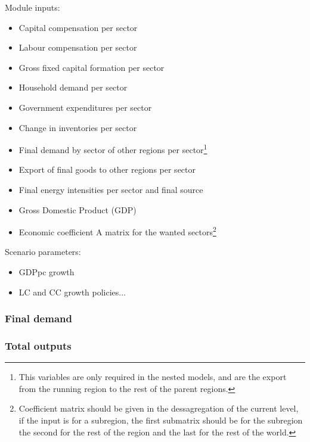 

Module inputs:
\begin{itemize}
    \item Capital compensation per sector
    \item Labour compensation per sector
    \item Gross fixed capital formation per sector
    \item Household demand per sector
    \item Government expenditures per sector
    \item Change in inventories per sector
    \item Final demand by sector of other regions per sector\footnote{\label{fnote:regional-var}This variables are only required in the nested models, and are the export from the running region to the rest of the parent regions.}
    \item Export of final goods to other regions per sector
    \item Final energy intensities per sector and final source
    \item Gross Domestic Product (GDP)
    \item Economic coefficient A matrix for the wanted sectors\footnote{Coefficient matrix should be given in the dessagregation of the current level, if the input is for a subregion, the first submatrix should be for the subregion the second for the rest of the region and the last for the rest of the world.}
\end{itemize}

Scenario parameters:
\begin{itemize}
    \item GDPpc growth
    \item LC and CC growth policies...
\end{itemize}

\subsubsection{Final demand}
    \label{se:economy-final_demand}
    

 \subsubsection{Total outputs}
    \label{se:economy-total_outputs}
    
